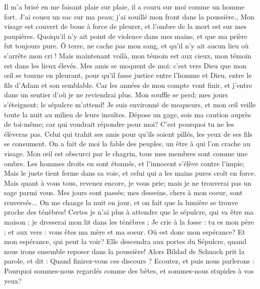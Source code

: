 \begin{multicols}{2}
Il m'a brisé en me faisant plaie sur plaie, il a couru sur moi comme un homme fort.
J'ai cousu un sac sur ma peau; j'ai souillé mon front dans la poussière.,
Mon visage est couvert de boue à force de pleurer, et l'ombre de la mort est sur mes paupières.  
Quoiqu'il n'y ait point de violence dans mes mains, et que ma prière fut toujours pure.
Ô terre, ne cache pas mon sang, et qu'il n'y ait aucun lieu où s'arrête mon cri !
Mais maintenant voilà, mon témoin est aux cieux, mon témoin est dans les lieux élevés.
Mes amis se moquent de moi: c'est vers Dieu que mon œil se tourne en pleurant,
pour qu'il fasse justice entre l'homme et Dieu, entre le fils d'Adam et son semblable.
Car les années de mon compte vont finir, et j'entre dans un sentier d'où je ne reviendrai plus. 
\VerseOne{}Mon souffle se perd; mes jours s'éteignent; le sépulcre m'attend! 
Je suis environné de moqueurs, et mon œil veille toute la nuit au milieu de leurs insultes.
Dépose un gage, sois ma caution auprès de toi-même; car qui voudrait répondre pour moi? 
C'est pourquoi tu ne les élèveras pas.
Celui qui trahit ses amis pour qu'ils soient pillés, les yeux de ses fils se consument.
On a fait de moi la fable des peuples, un être à qui l'on crache au visage.
Mon œil est obscurci par le chagrin, tous mes membres sont comme une ombre.
Les hommes droits en sont étonnés, et l'innocent s'élève contre l'impie;
Mais le juste tient ferme dans sa voie, et celui qui a les mains pures croît en force. 
Mais quant à vous tous, revenez encore, je vous prie; mais je ne trouverai pas un sage parmi vous. 
Mes jours sont passés; mes desseins, chers à mon coeur, sont renversés... 
On me change la nuit en jour, et on fait que la lumière se trouve proche des ténèbres! 
Certes je n'ai plus à attendre que le sépulcre, qui va être ma maison ; je dresserai mon lit dans les ténèbres ;
Je crie à la fosse : tu es mon père ; et aux vers : vous êtes ma mère et ma soeur. 
Où est donc mon espérance? Et mon espérance, qui peut la voir?
Elle descendra aux portes du Sépulcre, quand nous irons ensemble reposer dans la poussière! 
\VerseOne{}Alors Bildad de Schuach prit la parole, et dit :
Quand finirez-vous ces discours ? Ecoutez, et puis nous parlerons :
Pourquoi sommes-nous regardés comme des bêtes, et sommes-nous stupides à vos yeux? 

\end{multicols}
